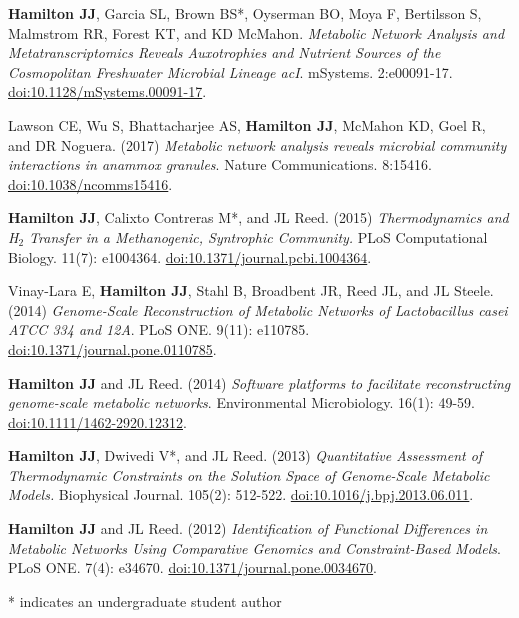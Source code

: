 \documentclass[letterpaper,11pt]{article}
\newlength{\outerbordwidth}
\newcommand{\resheading}[1]{\vspace{8pt}
  \parbox{\textwidth}{
  \setlength{\FrameSep}{\outerbordwidth}
\setlength{\fboxsep}{0pt}
\framebox[\textwidth][l]{\setlength{\fboxsep}{4pt}\fcolorbox{shadecolorB}{shadecolorB}{\textbf{\sffamily{\mbox{~}\makebox[6.262in][l]{\large #1} \vphantom{p\^{E}}}}}}
  }
  \vspace{-5pt}
}
\begin{document}

\resheading{Publications}
\begin{etaremune}[itemsep=-2pt]
	\item \textbf{Hamilton JJ}, Garcia SL, Brown BS*, Oyserman BO, Moya F, Bertilsson S, Malmstrom RR, Forest KT, and KD McMahon. \emph{Metabolic Network Analysis and Metatranscriptomics Reveals Auxotrophies and Nutrient Sources of the Cosmopolitan Freshwater Microbial Lineage acI}. mSystems. 2:e00091-17. \href{https://doi.org/10.1128/mSystems.00091-17}{doi:10.1128/mSystems.00091-17}.
	\item Lawson CE, Wu S, Bhattacharjee AS, \textbf{Hamilton JJ}, McMahon KD, Goel R, and DR Noguera. (2017) \emph{Metabolic network analysis reveals microbial community interactions in anammox granules}. Nature Communications. 8:15416. \href{https://www.nature.com/articles/ncomms15416}{doi:10.1038/ncomms15416}.
	\item \textbf{Hamilton JJ}, Calixto Contreras M*, and JL Reed. (2015) \emph{Thermodynamics and H$_2$ Transfer in a Methanogenic, Syntrophic Community.} PLoS Computational Biology. 11(7): e1004364. \href{http://journals.plos.org/ploscompbiol/article?id=10.1371/journal.pcbi.1004364}{doi:10.1371/journal.pcbi.1004364}.
	\item Vinay-Lara E, \textbf{Hamilton JJ}, Stahl B, Broadbent JR, Reed JL, and JL Steele. (2014) \emph{Genome-Scale Reconstruction of Metabolic Networks of Lactobacillus casei ATCC 334 and 12A}. PLoS ONE. 9(11): e110785. \href{http://journals.plos.org/plosone/article?id=10.1371/journal.pone.0110785}{doi:10.1371/journal.pone.0110785}.
	\item \textbf{Hamilton JJ} and JL Reed. (2014) \emph{Software platforms to facilitate reconstructing genome-scale metabolic networks}. Environmental Microbiology. 16(1): 49-59. \href{http://onlinelibrary.wiley.com/doi/10.1111/1462-2920.12312/abstract}{doi:10.1111/1462-2920.12312}.
	\item \textbf{Hamilton JJ}, Dwivedi V*, and JL Reed. (2013) \emph{Quantitative Assessment of Thermodynamic Constraints on the Solution Space of Genome-Scale Metabolic Models.} Biophysical Journal. 105(2): 512-522. \href{http://www.cell.com/biophysj/abstract/S0006-3495%2813%2900685-1}{doi:10.1016/j.bpj.2013.06.011}.
	\item \textbf{Hamilton JJ} and JL Reed. (2012) \emph{Identification of Functional Differences in Metabolic Networks Using Comparative Genomics and Constraint-Based Models}. PLoS ONE. 7(4): e34670. \href{http://journals.plos.org/plosone/article?id=10.1371/journal.pone.0034670}{doi:10.1371/journal.pone.0034670}.
\end{etaremune}
* indicates an undergraduate student author
\end{document}
